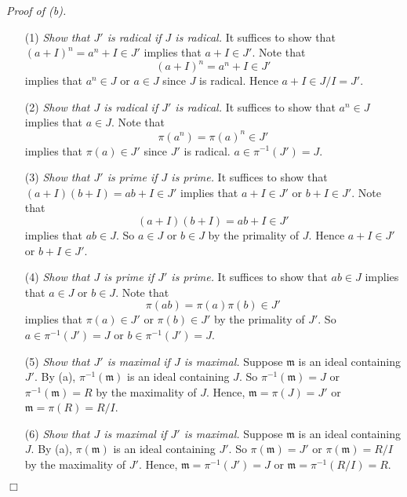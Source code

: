 \documentclass{article}
\begin{document}
\emph{Proof of (b).}
\begin{enumerate}
\item[(1)]
  \emph{Show that $J'$ is radical if $J$ is radical.}
  It suffices to show that $(a + I)^n = a^n + I \in J'$ implies that $a + I \in J'$.
  Note that
  \[
    (a + I)^n = a^n + I \in J'
  \]
  implies that $a^n \in J$ or $a \in J$ since $J$ is radical.
  Hence $a + I \in J/I = J'$.

\item[(2)]
  \emph{Show that $J$ is radical if $J'$ is radical.}
  It suffices to show that $a^n \in J$ implies that $a \in J$.
  Note that
  \[
    \pi(a^n) = \pi(a)^n \in J'
  \]
  implies that $\pi(a) \in J'$ since $J'$ is radical.
  $a \in \pi^{-1}(J') = J$.

\item[(3)]
  \emph{Show that $J'$ is prime if $J$ is prime.}
  It suffices to show that
  $(a + I)(b + I) = ab + I \in J'$ implies that $a + I \in J'$ or $b + I \in J'$.
  Note that
  \[
    (a + I)(b + I) = ab + I \in J'
  \]
  implies that $ab \in J$. So $a \in J$ or $b \in J$ by the primality of $J$.
  Hence $a + I \in J'$ or $b + I \in J'$.

\item[(4)]
  \emph{Show that $J$ is prime if $J'$ is prime.}
  It suffices to show that $ab \in J$ implies that $a \in J$ or $b \in J$.
  Note that
  \[
    \pi(ab) = \pi(a)\pi(b) \in J'
  \]
  implies that $\pi(a) \in J'$ or $\pi(b) \in J'$ by the primality of $J'$.
  So $a \in \pi^{-1}(J') = J$ or $b \in \pi^{-1}(J') = J$.

\item[(5)]
  \emph{Show that $J'$ is maximal if $J$ is maximal.}
  Suppose $\mathfrak{m}$ is an ideal containing $J'$.
  By (a), $\pi^{-1}(\mathfrak{m})$ is an ideal containing $J$.
  So $\pi^{-1}(\mathfrak{m}) = J$ or $\pi^{-1}(\mathfrak{m}) = R$ by the maximality of $J$.
  Hence, $\mathfrak{m} = \pi(J) = J'$ or $\mathfrak{m} = \pi(R) = R/I$.

\item[(6)]
  \emph{Show that $J$ is maximal if $J'$ is maximal.}
  Suppose $\mathfrak{m}$ is an ideal containing $J$.
  By (a), $\pi(\mathfrak{m})$ is an ideal containing $J'$.
  So $\pi(\mathfrak{m}) = J'$ or $\pi(\mathfrak{m}) = R/I$ by the maximality of $J'$.
  Hence, $\mathfrak{m} = \pi^{-1}(J') = J$ or $\mathfrak{m} = \pi^{-1}(R/I) = R$.
\end{enumerate}
$\Box$ \\
\end{document}
